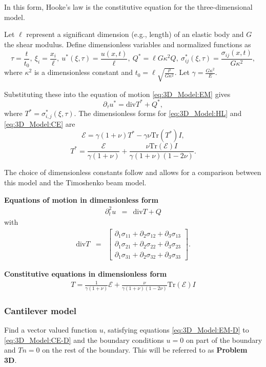 			In this form, Hooke's law is the constitutive equation for the three-dimensional model.

			Let $\ell$ represent a significant dimension (e.g., length) of an elastic body and $G$ the shear modulus. Define dimensionless variables and normalized functions as
			\[\tau = \frac{t}{t_0},\ \xi_i = \frac{x_i}{\ell},\ u^*(\xi,\tau) = \frac{u(x,t)}{\ell},\ Q^{*} = \ell G \kappa^2 Q,\ \sigma_{ij}^*(\xi,\tau) = \frac{\sigma_{ij}(x,t)}{G\kappa^2},\]
			where $\kappa^2$ is a dimensionless constant and $\displaystyle t_0 = \ell\sqrt{\frac{\rho}{G\kappa^2}}$. Let $\displaystyle \gamma= \frac{G\kappa^2}{E}$.

			Substituting these into the equation of motion \eqref{eq:3D_Model:EM} gives
			\[\partial_{\tau} u^{*} = \text{div}T^* + Q^*,\]
			where $\displaystyle T^* = \sigma_{i,j}^*(\xi,\tau)$. The dimensionless forms for \eqref{eq:3D_Model:HL} and \eqref{eq:3D_Model:CE} are
			\[\mathcal{E} = \gamma(1+\nu)T^* - \gamma\nu \text{Tr}(T^*)I,\]
			\[T^* = \frac{\mathcal{E}}{\gamma(1+\nu)} + \frac{\nu\text{Tr}(\mathcal{E})I}{\gamma(1+\nu)(1-2\nu)}.\]

			The choice of dimensionless constants follow \cite{LVV09} and allows for a comparison between this model and the Timoshenko beam model.


		\textbf{Equations of motion in dimensionless form}
			\begin{eqnarray}
				\partial_t^2 u & = & \textrm{div}T + Q \label{eq:3D_Model:EM-D}
			\end{eqnarray}
			with
			\begin{eqnarray}
				\textrm{div}  T & = &
				\begin{bmatrix}
					\partial_1 \sigma_{11} + \partial_2 \sigma_{12} + \partial_3 \sigma_{13} \\
					\partial_1 \sigma_{21} + \partial_2 \sigma_{22} + \partial_3 \sigma_{23} \\
					\partial_1 \sigma_{31} + \partial_2 \sigma_{32} + \partial_3 \sigma_{33}
				\end{bmatrix}.\label{eq:3D_Model:divT-D}
			\end{eqnarray}

		\textbf{Constitutive equations in dimensionless form}
			\begin{eqnarray}
				T = \frac{1}{\gamma(1+\nu)} \mathcal{E} + \frac{\nu}{\gamma(1+\nu)(1-2\nu)}\textrm{Tr}(\mathcal{E})I \label{eq:3D_Model:CE-D}
			\end{eqnarray}

		\subsubsection*{Cantilever model}
			Find a vector valued function $u$, satisfying equations
			\eqref{eq:3D_Model:EM-D} to \eqref{eq:3D_Model:CE-D} and the boundary
			conditions $\displaystyle u = 0$ on part of the boundary and $\displaystyle Tn = 0$ on the rest of the boundary. This will be referred to as \textbf{Problem 3D}.
			
